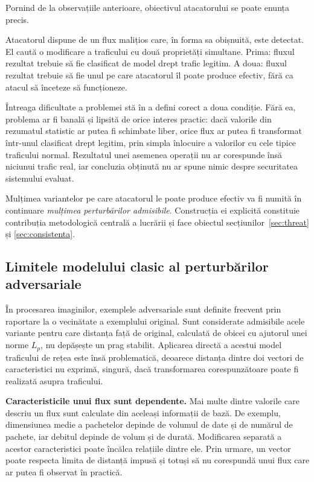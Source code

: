 Pornind de la observațiile anterioare, obiectivul atacatorului se poate enunța precis.

Atacatorul dispune de un flux malițios care, în forma sa obișnuită, este detectat. El caută o modificare a traficului cu două proprietăți simultane. Prima: fluxul rezultat trebuie să fie clasificat de model drept trafic legitim. A doua: fluxul rezultat trebuie să fie unul pe care atacatorul îl poate produce efectiv, fără ca atacul să înceteze să funcționeze.

Întreaga dificultate a problemei stă în a defini corect a doua condiție. Fără ea, problema ar fi banală și lipsită de orice interes practic: dacă valorile din rezumatul statistic ar putea fi schimbate liber, orice flux ar putea fi transformat într-unul clasificat drept legitim, prin simpla înlocuire a valorilor cu cele tipice traficului normal. Rezultatul unei asemenea operații nu ar corespunde însă niciunui trafic real, iar concluzia obținută nu ar spune nimic despre securitatea sistemului evaluat.

Mulțimea variantelor pe care atacatorul le poate produce efectiv va fi numită în continuare \emph{mulțimea perturbărilor admisibile}. Construcția ei explicită constituie contribuția metodologică centrală a lucrării și face obiectul secțiunilor~\ref{sec:threat} și \ref{sec:consistenta}.

\subsection{Limitele modelului clasic al perturbărilor adversariale}
\label{subsec:lp}

În procesarea imaginilor, exemplele adversariale sunt definite frecvent prin raportare la o vecinătate a exemplului original. Sunt considerate admisibile acele variante pentru care distanța față de original, calculată de obicei cu ajutorul unei norme \(L_p\), nu depășește un prag stabilit. Aplicarea directă a acestui model traficului de rețea este însă problematică, deoarece distanța dintre doi vectori de caracteristici nu exprimă, singură, dacă transformarea corespunzătoare poate fi realizată asupra traficului.

\textbf{Caracteristicile unui flux sunt dependente.}
Mai multe dintre valorile care descriu un flux sunt calculate din aceleași informații de bază. De exemplu, dimensiunea medie a pachetelor depinde de volumul de date și de numărul de pachete, iar debitul depinde de volum și de durată. Modificarea separată a acestor caracteristici poate încălca relațiile dintre ele. Prin urmare, un vector poate respecta limita de distanță impusă și totuși să nu corespundă unui flux care ar putea fi observat în practică.

